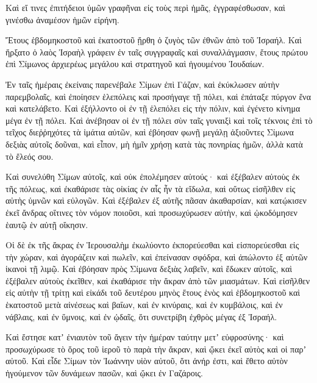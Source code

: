 {Καὶ εἴ τινες ἐπιτήδειοι ὑμῶν γραφῆναι εἰς τοὺς περὶ ἡμᾶς, ἐγγραφέσθωσαν, καὶ γινέσθω ἀναμέσον ἡμῶν εἰρήνη.
\par }{\PP {}Ἔτους ἑβδομηκοστοῦ καὶ ἑκατοστοῦ ᾔρθη ὁ ζυγὸς τῶν ἐθνῶν ἀπὸ τοῦ Ἰσραήλ.
Καὶ ἤρξατο ὁ λαὸς Ἰσραὴλ γράφειν ἐν ταῖς συγγραφαῖς καὶ συναλλάγμασιν, ἔτους πρώτου ἐπὶ Σίμωνος ἀρχιερέως μεγάλου καὶ στρατηγοῦ καὶ ἡγουμένου Ἰουδαίων.
\par }{\PP {}Ἐν ταῖς ἡμέραις ἐκείναις παρενέβαλε Σίμων ἐπὶ Γάζαν, καὶ ἐκύκλωσεν αὐτὴν παρεμβολαῖς, καὶ ἐποίησεν ἑλεπόλεις καὶ προσήγαγε τῇ πόλει, καὶ ἐπάταξε πύργον ἕνα καὶ κατελάβετο.
Καὶ ἐξήλλοντο οἱ ἐν τῇ ἑλεπόλει εἰς τὴν πόλιν, καὶ ἐγένετο κίνημα μέγα ἐν τῇ πόλει.
Καὶ ἀνέβησαν οἱ ἐν τῇ πόλει σὺν ταῖς γυναιξὶ καὶ τοῖς τέκνοις ἐπὶ τὸ τεῖχος διεῤῥηχότες τὰ ἱμάτια αὐτῶν, καὶ ἐβόησαν φωνῇ μεγάλῃ ἀξιοῦντες Σίμωνα δεξιὰς αὐτοῖς δοῦναι,
καὶ εἶπον, μὴ ἡμῖν χρήσῃ κατὰ τὰς πονηρίας ἡμῶν, ἀλλὰ κατὰ τὸ ἔλεός σου.
\par }{\PP {}Καὶ συνελύθη Σίμων αὐτοῖς, καὶ οὐκ ἐπολέμησεν αὐτούς· καὶ ἐξέβαλεν αὐτοὺς ἐκ τῆς πόλεως, καὶ ἐκαθάρισε τὰς οἰκίας ἐν αἷς ἦν τὰ εἴδωλα, καὶ οὕτως εἰσῆλθεν εἰς αὐτὴς ὑμνῶν καὶ εὐλογῶν.
Καὶ ἐξέβαλεν ἐξ αὐτῆς πᾶσαν ἀκαθαρσίαν, καὶ κατῴκισεν ἐκεῖ ἄνδρας οἵτινες τὸν νόμον ποιοῦσι, καὶ προσωχύρωσεν αὐτὴν, καὶ ᾠκοδόμησεν ἑαυτῷ ἑν αὐτῇ οἴκησιν.
\par }{\PP {}Οἱ δὲ ἐκ τῆς ἄκρας ἐν Ἱερουσαλὴμ ἐκωλύοντο ἐκπορεύεσθαι καὶ εἰσπορεύεσθαι εἰς τὴν χώραν, καὶ ἀγοράζειν καὶ πωλεῖν, καὶ ἐπείνασαν σφόδρα, καὶ ἀπώλοντο ἐξ αὐτῶν ἱκανοὶ τῇ λιμῷ.
Καὶ ἐβόησαν πρὸς Σίμωνα δεξιὰς λαβεῖν, καὶ ἔδωκεν αὐτοῖς, καὶ ἐξέβαλεν αὐτοὺς ἐκεῖθεν, καὶ ἐκαθάρισε τὴν ἄκραν ἀπὸ τῶν μιασμάτων.
Καὶ εἰσῆλθεν εἰς αὐτὴν τῇ τρίτῃ καὶ εἰκάδι τοῦ δευτέρου μηνὸς ἔτους ἑνὸς καὶ ἑβδομηκοστοῦ καὶ ἑκατοστοῦ μετὰ αἰνέσεως καὶ βαΐων, καὶ ἐν κινύραις, καὶ ἐν κυμβάλοις, καὶ ἐν νάβλαις, καὶ ἐν ὕμνοις, καὶ ἐν ᾠδαῖς, ὅτι συνετρίβη ἐχθρὸς μέγας ἐξ Ἰσραήλ.
\par }{\PP {}Καὶ ἔστησε κατʼ ἐνιαυτὸν τοῦ ἄγειν τὴν ἡμέραν ταύτην μετʼ εὐφροσύνης· καὶ προσωχύρωσε τὸ ὄρος τοῦ ἱεροῦ τὸ παρὰ τὴν ἄκραν, καὶ ᾤκει ἐκεῖ αὐτὸς καὶ οἱ παρʼ αὐτοῦ.
Καὶ εἶδε Σίμων τὸν Ἰωάννην υἱὸν αὐτοῦ, ὅτι ἀνήρ ἐστι, καὶ ἔθετο αὐτὸν ἡγούμενον τῶν δυνάμεων πασῶν, καὶ ᾤκει ἐν Γαζάροις.

}
